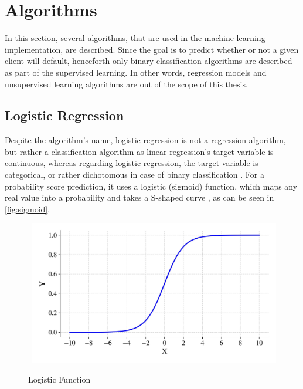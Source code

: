 \section{Algorithms}
\label{sec:algorithms}

In this section, several algorithms, that are used in the machine learning implementation, are described.
Since the goal is to predict whether or not a given client will default, henceforth only binary classification algorithms are described as part of the supervised learning. In other words, regression models and unsupervised learning algorithms are out of the scope of this thesis.
\subsection{Logistic Regression}
\label{subsubsec:logisticregression}
Despite the algorithm's name, logistic regression is not a regression algorithm, but rather a classification algorithm as linear regression's target variable is continuous, whereas regarding logistic regression, the target variable is categorical, or rather dichotomous in case of binary classification \citep{wendler2021data}.
For a probability score prediction, it uses a logistic (sigmoid) function, which maps any real value into a probability and takes a S-shaped curve \citep{zaidi2022mathematical}, as can be seen in \autoref{fig:sigmoid}.

\begin{figure}[H]
    \centering
    \caption{Logistic Function}\vspace{0.5em}
    \label{fig:sigmoid}\
    \includegraphics[width=110mm]{Figures/sigmoid.jpg}

    \vspace{-1em}
\end{figure}

